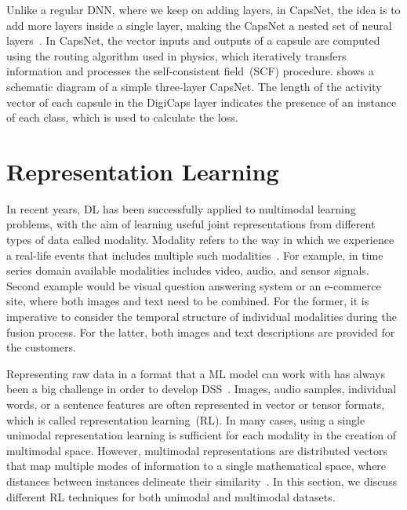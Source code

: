 \hspace*{3.5mm} Unlike a regular DNN, where we keep on adding layers, in CapsNet, the idea is to add more layers inside a single layer, making the CapsNet a nested set of neural layers~\cite{CapsNet}. In CapsNet, the vector inputs and outputs of a capsule are computed using the routing algorithm used in physics, which iteratively transfers information and processes the self-consistent field~(SCF) procedure.  shows a schematic diagram of a simple three-layer CapsNet. The length of the activity vector of each capsule in the DigiCaps layer indicates the presence of an instance of each class, which is used to calculate the loss. 
\fi 

\section{Representation Learning}
\label{sec:rep_learn} 
In recent years, DL has been successfully applied to multimodal learning problems, with the aim of learning useful joint representations from different types of data called modality. Modality refers to the way in which we experience a real-life events that includes multiple such modalities~\cite{mmsurvey}. For example, in time series domain available modalities includes video, audio, and sensor signals.
Second example would be visual question answering system or an e-commerce site, where both images and text need to be combined. For the former, it is imperative to consider the temporal structure of individual modalities during the fusion process. For the latter, both images and text descriptions are provided for the customers. 

\hspace*{3.5mm}Representing raw data in a format that a ML model can work with has always been a big challenge in order to develop DSS~\cite{mmsurvey}. Images, audio samples, individual words, or a sentence features are often represented in vector or tensor formats, which is called representation learning~(RL). In many cases, using a single unimodal representation learning is sufficient for each modality in the creation of multimodal space. However, multimodal representations are distributed vectors that map multiple modes of information to a single mathematical space, where distances between instances delineate their similarity~\cite{ito2018effects}. 
In this section, we discuss different RL techniques for both unimodal and multimodal datasets. 

